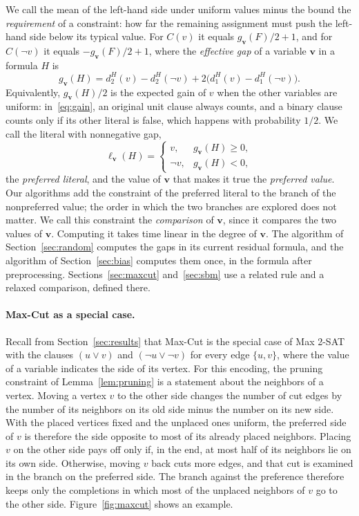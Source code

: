 \documentclass[11pt,a4paper]{article}
\theoremstyle{definition}
\theoremstyle{remark}
\begin{document}
We call the mean of the left-hand side under uniform values minus the bound
the \emph{requirement} of a constraint: how far the remaining assignment
must push the left-hand side below its typical value. For $C(v)$ it equals
$g_{\mathbf v}(F)/2+1$, and for $C(\neg v)$ it equals
$-g_{\mathbf v}(F)/2+1$, where the \emph{effective gap} of a variable
$\mathbf v$ in a formula $H$ is
\begin{equation}
 g_{\mathbf v}(H)=d_2^H(v)-d_2^H(\neg v)
                   +2\bigl(d_1^H(v)-d_1^H(\neg v)\bigr).
 \label{eq:effectivegap}
\end{equation}
Equivalently, $g_{\mathbf v}(H)/2$ is the expected gain of $v$ when the
other variables are uniform: in~\eqref{eq:gain}, an original unit clause
always counts, and a binary clause counts only if its other literal is
false, which happens with probability $1/2$. We call the literal with
nonnegative gap,
\begin{equation}
 \ell_{\mathbf v}(H)=
 \begin{cases}v,&g_{\mathbf v}(H)\ge0,\\
               \neg v,&g_{\mathbf v}(H)<0,
 \end{cases}
 \label{eq:bias_preference}
\end{equation}
the \emph{preferred literal}, and the value of $\mathbf v$ that makes it true
the \emph{preferred value}. Our algorithms add the constraint of the
preferred literal to the branch of the nonpreferred value; the order in
which the two branches are explored does not matter. We call this
constraint the \emph{comparison} of $\mathbf v$, since it compares the two
values of $\mathbf v$. Computing it takes time linear in the degree of
$\mathbf v$. The algorithm of Section~\ref{sec:random} computes the gaps in
its current residual formula, and the algorithm of Section~\ref{sec:bias}
computes them once, in the formula after preprocessing.
Sections~\ref{sec:maxcut} and~\ref{sec:sbm} use a related rule and a relaxed
comparison, defined there.

\paragraph{Max-Cut as a special case.}
Recall from Section~\ref{sec:results} that Max-Cut is the special case of
Max 2-SAT with the clauses $(u\vee v)$ and $(\neg u\vee\neg v)$ for every
edge $\{u,v\}$, where the value of a variable indicates the side of its
vertex. For this encoding, the pruning constraint of
Lemma~\ref{lem:pruning} is a statement about the neighbors of a vertex.
Moving a vertex $v$ to the other side changes the number of cut edges by
the number of its neighbors on its old side minus the number on its new
side. With the placed vertices fixed and the unplaced ones uniform, the
preferred side of $v$ is therefore the side opposite to most of its
already placed neighbors. Placing $v$ on the other side pays off only if,
in the end, at most half of its neighbors lie on its own side. Otherwise,
moving $v$ back cuts more edges, and that cut is examined in the branch on
the preferred side. The branch against the preference therefore keeps only
the completions in which most of the unplaced neighbors of $v$ go to the
other side. Figure~\ref{fig:maxcut} shows an example.
\end{document}
